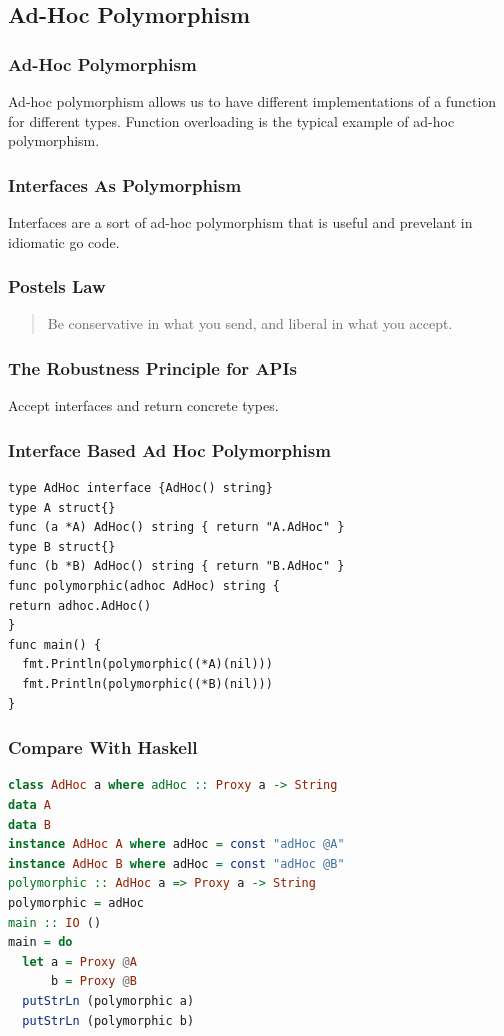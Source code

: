 \documentclass{beamer}
\begin{document}
\subsection{Ad-Hoc Polymorphism}
\begin{frame}
  \frametitle{Ad-Hoc Polymorphism}
  Ad-hoc polymorphism allows us to have different implementations of a
  function for different types.  Function overloading is the typical
  example of ad-hoc polymorphism.
\end{frame}

\begin{frame}
  \frametitle{Interfaces As Polymorphism}
  Interfaces are a sort of ad-hoc polymorphism that is useful and prevelant
  in idiomatic go code.\\\vspace{2mm}
\end{frame}

\begin{frame}
  \frametitle{Postels Law}
  \begin{quote}
    Be conservative in what you send, and liberal in what you accept.
  \end{quote}
\end{frame}

\begin{frame}
  \frametitle{The Robustness Principle for APIs}
  Accept interfaces and return concrete types.
\end{frame}

\begin{frame}[fragile]
  \frametitle{Interface Based Ad Hoc Polymorphism}
\begin{lstlisting}[language=Golang]
type AdHoc interface {AdHoc() string}
type A struct{}
func (a *A) AdHoc() string { return "A.AdHoc" }
type B struct{}
func (b *B) AdHoc() string { return "B.AdHoc" }
func polymorphic(adhoc AdHoc) string {
return adhoc.AdHoc()
}
func main() {
  fmt.Println(polymorphic((*A)(nil)))
  fmt.Println(polymorphic((*B)(nil)))
}
\end{lstlisting}
\end{frame}

\begin{frame}[fragile]
  \frametitle{Compare With Haskell}
\begin{lstlisting}[language=Haskell]
class AdHoc a where adHoc :: Proxy a -> String
data A
data B
instance AdHoc A where adHoc = const "adHoc @A"
instance AdHoc B where adHoc = const "adHoc @B"
polymorphic :: AdHoc a => Proxy a -> String
polymorphic = adHoc
main :: IO ()
main = do
  let a = Proxy @A
      b = Proxy @B
  putStrLn (polymorphic a)
  putStrLn (polymorphic b)
\end{lstlisting}
\end{frame}
\end{document}
